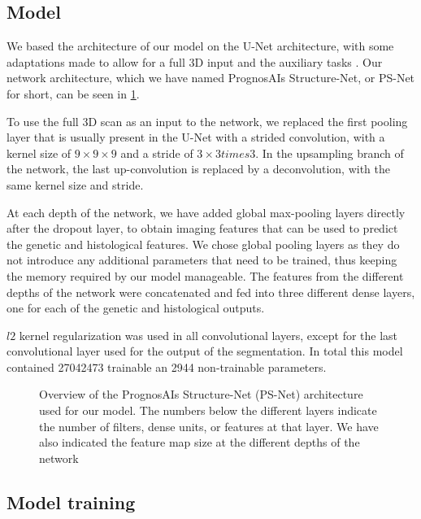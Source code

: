 \subsection{Model}\label{sec:model}

We based the architecture of our model on the U-Net architecture, with some adaptations made to allow for a full 3D input and the auxiliary tasks \autocite{ronneberger2015u}.
Our network architecture, which we have named PrognosAIs Structure-Net, or PS-Net for short, can be seen in \cref{fig:psnet_architecture}.

To use the full 3D scan as an input to the network, we replaced the first pooling layer that is usually present in the U-Net with a strided convolution, with a kernel size of $9\times9\times9$ and a stride of $3\times3times3$.
In the upsampling branch of the network, the last up-convolution is replaced by a deconvolution, with the same kernel size and stride.

At each depth of the network, we have added global max-pooling layers directly after the dropout layer, to obtain imaging features that can be used to predict the genetic and histological features.
We chose global pooling layers as they do not introduce any additional parameters that need to be trained, thus keeping the memory required by our model manageable.
The features from the different depths of the network were concatenated and fed into three different dense layers, one for each of the genetic and histological outputs.

$l2$ kernel regularization was used in all convolutional layers, except for the last convolutional layer used for the output of the segmentation.
In total this model contained \num{27042473} trainable an \num{2944} non-trainable parameters.

\begin{figure}
\caption{Overview of the PrognosAIs Structure-Net (PS-Net) architecture used for our model. The numbers below the different layers indicate the number of filters, dense units, or features at that layer.
We have also indicated the feature map size at the different depths of the network}\label{fig:psnet_architecture}
\end{figure}

\subsection{Model training}

